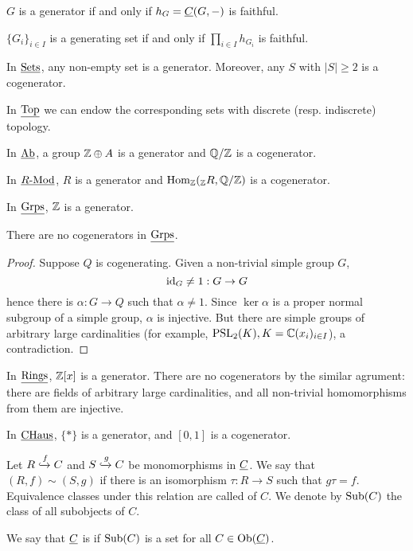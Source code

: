 \begin{remarks*}
	\item \( G \) is a generator if and only if \( h_G = \underline{C}(G, -) \) is faithful.
	\item \( \{G_i\}_{i \in I} \) is a generating set if and only if \( \prod_{i \in I} h_{G_i} \) is faithful.
\end{remarks*}

\begin{examples*}
	\item In \( \underline{\mathrm{Sets}} \), any non-empty set is a generator. Moreover, any \( S \) with \( |S| \ge 2 \) is a cogenerator.
	\item In \( \underline{\mathrm{Top}} \) we can endow the corresponding sets with discrete (resp. indiscrete) topology.
	\item In \( \underline{\mathrm{Ab}} \), a group \( \mathbb{Z} \oplus A \) is a generator and \( \mathbb{Q}/\mathbb{Z} \) is a cogenerator.
	\item In \( \underline{R\text{-}\mathrm{Mod}} \), \( R \) is a generator and \( \operatorname{Hom}_\mathbb{Z}(_\mathbb{Z} R, \mathbb{Q}/\mathbb{Z}) \) is a cogenerator.
	\item In \( \underline{\mathrm{Grps}} \), \( \mathbb{Z} \) is a generator.
		\begin{statement*}
			There are no cogenerators in \( \underline{\mathrm{Grps}} \).
		\end{statement*}
		\begin{proof}
			Suppose \( Q \) is cogenerating. Given a non-trivial simple group \( G \),
			\[
				\mathrm{id}_G \neq 1: G \to G
			\]
			hence there is \( \alpha: G \to Q \) such that \( \alpha \neq 1 \). Since \( \ker \alpha \) is a proper normal subgroup of a simple group, \( \alpha \) is injective. But there are simple groups of arbitrary large cardinalities (for example, \( \mathrm{PSL}_2(K), K = \mathbb{C}(x_i)_{i \in I} \)), a contradiction.
		\end{proof}
	\item In \( \underline{\mathrm{Rings}} \), \( \mathbb{Z}[x] \) is a generator. There are no cogenerators by the similar agrument: there are fields of arbitrary large cardinalities, and all non-trivial homomorphisms from them are injective.
	\item In \( \underline{\mathrm{CHaus}} \), \( \{\ast\} \) is a generator, and \( [0, 1] \) is a cogenerator.
\end{examples*}

\begin{definitions*}
	\item Let \( R \xhookrightarrow{f} C \) and \( S \xhookrightarrow{g} C \) be monomorphisms in \( \underline{C} \). We say that \( (R, f) \sim (S, g) \) if there is an isomorphism \( \tau: R \to S \) such that \( g \tau = f \). Equivalence classes under this relation are called  of \( C \). We denote by \( \mathrm{Sub}(C) \) the class of all subobjects of \( C \).
	\item We say that \( \underline{C} \) is  if \( \mathrm{Sub}(C) \) is a set for all \( C \in \operatorname{Ob}(\underline{C}) \).
\end{definitions*}


